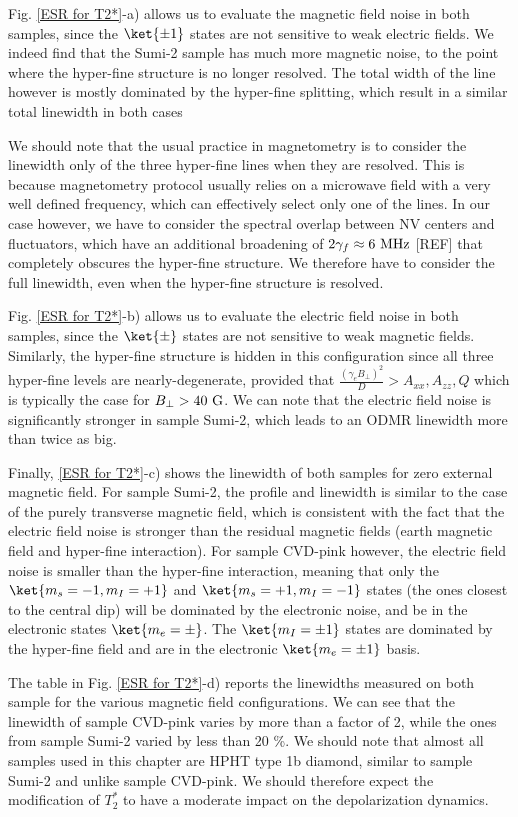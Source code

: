 \documentclass[a4paper,11pt]{report}
\begin{document}
\begin{refsection}
Fig. \ref{ESR for T2*}-a) allows us to evaluate the magnetic field noise in both samples, since the $\ket{\pm 1}$ states are not sensitive to weak electric fields. We indeed find that the Sumi-2 sample has much more magnetic noise, to the point where the hyper-fine structure is no longer resolved. The total width of the line however is mostly dominated by the hyper-fine splitting, which result in a similar total linewidth in both cases

We should note that the usual practice in magnetometry is to consider the linewidth only of the three hyper-fine lines when they are resolved. This is because magnetometry protocol usually relies on a microwave field with a very well defined frequency, which can effectively select only one of the lines. In our case however, we have to consider the spectral overlap between NV centers and fluctuators, which have an additional broadening of $2\gamma_f \approx 6\ \rm MHz$ [REF] that completely obscures the hyper-fine structure. We therefore have to consider the full linewidth, even when the hyper-fine structure is resolved.

Fig. \ref{ESR for T2*}-b) allows us to evaluate the electric field noise in both samples, since the $\ket{\pm}$ states are not sensitive to weak magnetic fields. Similarly, the hyper-fine structure is hidden in this configuration since all three hyper-fine levels are nearly-degenerate, provided that $\frac{(\gamma_e B_\perp)^2}{D} > A_{xx},A_{zz},Q$ which is typically the case for $B_\perp > 40\ \rm G$. We can note that the electric field noise is significantly stronger in sample Sumi-2, which leads to an ODMR linewidth more than twice as big.

Finally, \ref{ESR for T2*}-c) shows the linewidth of both samples for zero external magnetic field. For sample Sumi-2, the profile and linewidth is similar to the case of the purely transverse magnetic field, which is consistent with the fact that the electric field noise is stronger than the residual magnetic fields (earth magnetic field and hyper-fine interaction). For sample CVD-pink however, the electric field noise is smaller than the hyper-fine interaction, meaning that only the $\ket{m_s=-1,m_I=+1}$ and $\ket{m_s=+1,m_I=-1}$ states (the ones closest to the central dip) will be dominated by the electronic noise, and be in the electronic states $\ket{m_e=\pm}$. The $\ket{m_I=\pm 1}$ states are dominated by the hyper-fine field and are in the electronic $\ket{m_e=\pm 1}$ basis.

The table in Fig. \ref{ESR for T2*}-d) reports the linewidths measured on both sample for the various magnetic field configurations. We can see that the linewidth of sample CVD-pink varies by more than a factor of 2, while the ones from sample Sumi-2 varied by less than 20 \%. We should note that  almost all samples used in this chapter are HPHT type 1b diamond, similar to sample Sumi-2 and unlike sample CVD-pink. We should therefore expect the modification of $T_2^*$ to have a moderate impact on the depolarization dynamics.


\end{refsection}
\end{document}
